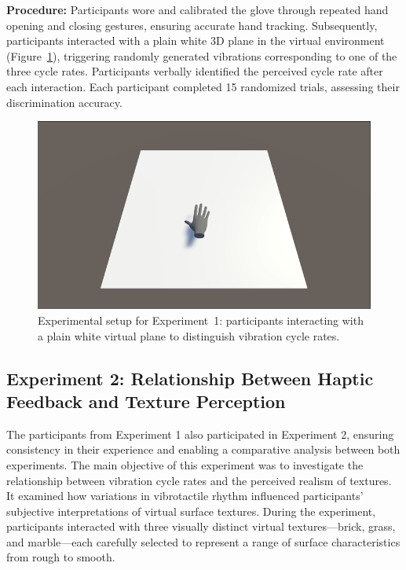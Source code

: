 \textbf{Procedure:} Participants wore and calibrated the glove through repeated hand opening and closing gestures, ensuring accurate hand tracking. Subsequently, participants interacted with a plain white 3D plane in the virtual environment (Figure~\ref{fig:experiment1_setup}), triggering randomly generated vibrations corresponding to one of the three cycle rates. Participants verbally identified the perceived cycle rate after each interaction. Each participant completed 15 randomized trials, assessing their discrimination accuracy.

\begin{figure}[H]\centering
	\includegraphics[width=1\textwidth]{Pictures/ex1.png}%
	\caption{Experimental setup for Experiment~1: participants interacting with a plain white virtual plane to distinguish vibration cycle rates.}\label{fig:experiment1_setup}%
	
\end{figure}

\newpage
\subsection{Experiment 2: Relationship Between Haptic Feedback and Texture Perception}
The participants from Experiment 1 also participated in Experiment 2, ensuring consistency in their experience and enabling a comparative analysis between both experiments. The main objective of this experiment was to investigate the relationship between vibration cycle rates and the perceived realism of textures. It examined how variations in vibrotactile rhythm influenced participants’ subjective interpretations of virtual surface textures. During the experiment, participants interacted with three visually distinct virtual textures—brick, grass, and marble—each carefully selected to represent a range of surface characteristics from rough to smooth.

